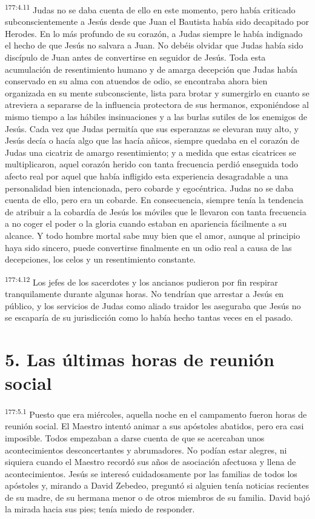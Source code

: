 \par 
\textsuperscript{177:4.11} Judas no se daba cuenta de ello en este momento, pero había criticado subconscientemente a Jesús desde que Juan el Bautista había sido decapitado por Herodes. En lo más profundo de su corazón, a Judas siempre le había indignado el hecho de que Jesús no salvara a Juan. No debéis olvidar que Judas había sido discípulo de Juan antes de convertirse en seguidor de Jesús. Toda esta acumulación de resentimiento humano y de amarga decepción que Judas había conservado en su alma con atuendos de odio, se encontraba ahora bien organizada en su mente subconsciente, lista para brotar y sumergirlo en cuanto se atreviera a separarse de la influencia protectora de sus hermanos, exponiéndose al mismo tiempo a las hábiles insinuaciones y a las burlas sutiles de los enemigos de Jesús. Cada vez que Judas permitía que sus esperanzas se elevaran muy alto, y Jesús decía o hacía algo que las hacía añicos, siempre quedaba en el corazón de Judas una cicatriz de amargo resentimiento; y a medida que estas cicatrices se multiplicaron, aquel corazón herido con tanta frecuencia perdió enseguida todo afecto real por aquel que había infligido esta experiencia desagradable a una personalidad bien intencionada, pero cobarde y egocéntrica. Judas no se daba cuenta de ello, pero era un cobarde. En consecuencia, siempre tenía la tendencia de atribuir a la cobardía de Jesús los móviles que le llevaron con tanta frecuencia a no coger el poder o la gloria cuando estaban en apariencia fácilmente a su alcance. Y todo hombre mortal sabe muy bien que el amor, aunque al principio haya sido sincero, puede convertirse finalmente en un odio real a causa de las decepciones, los celos y un resentimiento constante.

\par 
\textsuperscript{177:4.12} Los jefes de los sacerdotes y los ancianos pudieron por fin respirar tranquilamente durante algunas horas. No tendrían que arrestar a Jesús en público, y los servicios de Judas como aliado traidor les aseguraba que Jesús no se escaparía de su jurisdicción como lo había hecho tantas veces en el pasado.

\section*{5. Las últimas horas de reunión social}
\par 
\textsuperscript{177:5.1} Puesto que era miércoles, aquella noche en el campamento fueron horas de reunión social. El Maestro intentó animar a sus apóstoles abatidos, pero era casi imposible. Todos empezaban a darse cuenta de que se acercaban unos acontecimientos desconcertantes y abrumadores. No podían estar alegres, ni siquiera cuando el Maestro recordó sus años de asociación afectuosa y llena de acontecimientos. Jesús se interesó cuidadosamente por las familias de todos los apóstoles y, mirando a David Zebedeo, preguntó si alguien tenía noticias recientes de su madre, de su hermana menor o de otros miembros de su familia. David bajó la mirada hacia sus pies; tenía miedo de responder.

